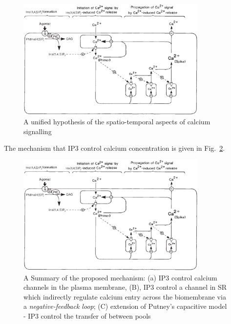 

\begin{figure}[htb]
    \centerline{\includegraphics[height=6cm]{./images/IP3_calcium_signalling.eps}}
\caption{A unified hypothesis of the spatio-temporal aspects of
  calcium signalling~\citep{berridge1989ipa}}\label{fig:IP3_Ca_signal}
  \end{figure}
  The mechanism that IP3 control calcium concentration is given in
  Fig.~\ref{fig:IP3_hypothesis}.


\begin{figure}[htb]
    \centerline{\includegraphics[height=6cm]{./images/IP3_calcium_signalling.eps}}
\caption{A Summary of the proposed mechanism: (a) IP3 control calcium
  channels in the plasma membrane, (B), IP3 control a channel in SR
  which indirectly regulate calcium entry across the biomembrane via a
  {\it negative-feedback loop}; (C) extension of Putney's capacitive
  model - IP3 control the transfer of  between pools~\citep{berridge1989ipa}}\label{fig:IP3_hypothesis}
  \end{figure}

